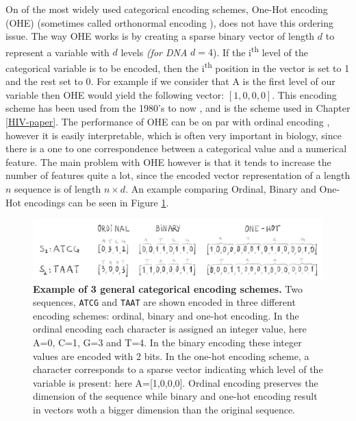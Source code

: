 \documentclass[
  11pt,
  twoside,
  BCOR=10mm,
  listof=totoc]{scrbook}
\newcommand{\extcaption}[2]{
    \caption[#1]{
        \textbf{#1}\newline
        #2
    }
}
\begin{document}
On of the most widely used categorical encoding schemes, One-Hot encoding (OHE) (sometimes called orthonormal encoding \autocite{singhEvolutionaryBasedOptimal2018}), does not have this ordering issue. The way OHE works is by creating a sparse binary vector of length \(d\) to represent a variable with \(d\) levels \emph{(for DNA} \(d=4\)). If the i\textsuperscript{th} level of the categorical variable is to be encoded, then the i\textsuperscript{th} position in the vector is set to 1 and the rest set to 0. For example if we consider that A is the first level of our variable then OHE would yield the following vector: \([1,0,0,0]\). This encoding scheme has been used from the 1980's \autocite{qianPredictingSecondaryStructure1988} to now \autocite{budachPyssterClassificationBiological2018}, and is the scheme used in Chapter \ref{HIV-paper}. The performance of OHE can be on par with ordinal encoding \autocite{choongEvaluationConvolutionaryNeural2017}, however it is easily interpretable, which is often very important in biology, since there is a one to one correspondence between a categorical value and a numerical feature. The main problem with OHE however is that it tends to increase the number of features quite a lot, since the encoded vector representation of a length \(n\) sequence is of length \(n\times d\). An example comparing Ordinal, Binary and One-Hot encodings can be seen in Figure \ref{fig:generalEncoding}.

\begin{figure}
\centering
\includegraphics[width=\textwidth]{figures/Encode-seqs/General-purpose.png}
\extcaption{Example of 3 general categorical encoding schemes.}{Two sequences, \texttt{ATCG} and \texttt{TAAT} are shown encoded in three different encoding schemes: ordinal, binary and one-hot encoding. In the ordinal encoding each character is assigned an integer value, here A=0, C=1, G=3 and T=4. In the binary encoding these integer values are encoded with 2 bits. In the one-hot encoding scheme, a character corresponds to a sparse vector indicating which level of the variable is present: here A=[1,0,0,0]. Ordinal encoding preserves the dimension of the sequence while binary and one-hot encoding result in vectors woth a bigger dimension than the original sequence.}
\label{fig:generalEncoding}
\end{figure}
\end{document}

